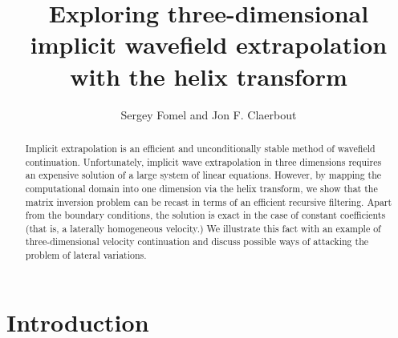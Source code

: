 

\title{Exploring three-dimensional implicit wavefield extrapolation
  with the helix transform}


\author{Sergey Fomel and Jon F. Claerbout}

\maketitle

\begin{abstract}
  Implicit extrapolation is an efficient and unconditionally stable
  method of wavefield continuation. Unfortunately, implicit wave
  extrapolation in three dimensions requires an expensive solution of
  a large system of linear equations. However, by mapping the
  computational domain into one dimension via the helix transform, we
  show that the matrix inversion problem can be recast in terms of an
  efficient recursive filtering. Apart from the boundary conditions,
  the solution is exact in the case of constant coefficients (that is,
  a laterally homogeneous velocity.) We illustrate this fact with an
  example of three-dimensional velocity continuation and discuss
  possible ways of attacking the problem of lateral variations.
\end{abstract}

\section{Introduction}

